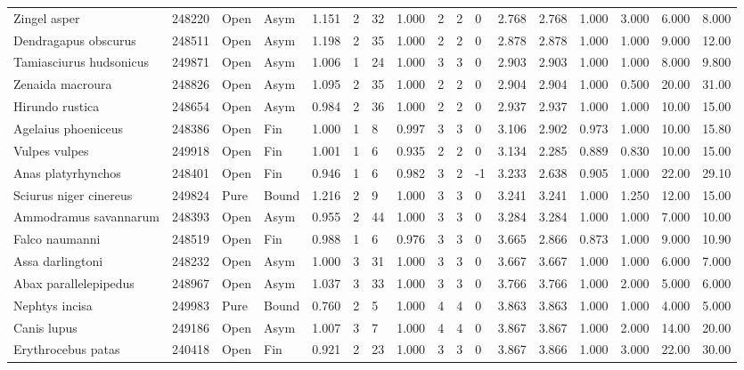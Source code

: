 \documentclass[10pt,a4paper]{amsart}
\theoremstyle{definition}
\theoremstyle{remark}
\numberwithin{equation}{section}
\begin{document}
\begin{table}[ht]
{\begin{tabular}{lllllllllllllllll}
Zingel asper & 248220 & Open & Asym & 1.151 & 2 & 32 & 1.000 & 2 & 2 & 0 & 2.768 & 2.768 & 1.000 & 3.000 & 6.000 & 8.000 \\
Dendragapus obscurus & 248511 & Open & Asym & 1.198 & 2 & 35 & 1.000 & 2 & 2 & 0 & 2.878 & 2.878 & 1.000 & 1.000 & 9.000 & 12.00 \\
Tamiasciurus hudsonicus & 249871 & Open & Asym & 1.006 & 1 & 24 & 1.000 & 3 & 3 & 0 & 2.903 & 2.903 & 1.000 & 1.000 & 8.000 & 9.800 \\
Zenaida macroura & 248826 & Open & Asym & 1.095 & 2 & 35 & 1.000 & 2 & 2 & 0 & 2.904 & 2.904 & 1.000 & 0.500 & 20.00 & 31.00 \\
Hirundo rustica & 248654 & Open & Asym & 0.984 & 2 & 36 & 1.000 & 2 & 2 & 0 & 2.937 & 2.937 & 1.000 & 1.000 & 10.00 & 15.00 \\
Agelaius phoeniceus & 248386 & Open & Fin & 1.000 & 1 & 8 & 0.997 & 3 & 3 & 0 & 3.106 & 2.902 & 0.973 & 1.000 & 10.00 & 15.80 \\
Vulpes vulpes & 249918 & Open & Fin & 1.001 & 1 & 6 & 0.935 & 2 & 2 & 0 & 3.134 & 2.285 & 0.889 & 0.830 & 10.00 & 15.00 \\
Anas platyrhynchos & 248401 & Open & Fin & 0.946 & 1 & 6 & 0.982 & 3 & 2 & -1 & 3.233 & 2.638 & 0.905 & 1.000 & 22.00 & 29.10 \\
Sciurus niger cinereus & 249824 & Pure & Bound & 1.216 & 2 & 9 & 1.000 & 3 & 3 & 0 & 3.241 & 3.241 & 1.000 & 1.250 & 12.00 & 15.00 \\
Ammodramus savannarum & 248393 & Open & Asym & 0.955 & 2 & 44 & 1.000 & 3 & 3 & 0 & 3.284 & 3.284 & 1.000 & 1.000 & 7.000 & 10.00 \\
Falco naumanni & 248519 & Open & Fin & 0.988 & 1 & 6 & 0.976 & 3 & 3 & 0 & 3.665 & 2.866 & 0.873 & 1.000 & 9.000 & 10.90 \\
Assa darlingtoni & 248232 & Open & Asym & 1.000 & 3 & 31 & 1.000 & 3 & 3 & 0 & 3.667 & 3.667 & 1.000 & 1.000 & 6.000 & 7.000 \\
Abax parallelepipedus & 248967 & Open & Asym & 1.037 & 3 & 33 & 1.000 & 3 & 3 & 0 & 3.766 & 3.766 & 1.000 & 2.000 & 5.000 & 6.000 \\
Nephtys incisa & 249983 & Pure & Bound & 0.760 & 2 & 5 & 1.000 & 4 & 4 & 0 & 3.863 & 3.863 & 1.000 & 1.000 & 4.000 & 5.000 \\
Canis lupus & 249186 & Open & Asym & 1.007 & 3 & 7 & 1.000 & 4 & 4 & 0 & 3.867 & 3.867 & 1.000 & 2.000 & 14.00 & 20.00 \\
Erythrocebus patas & 240418 & Open & Fin & 0.921 & 2 & 23 & 1.000 & 3 & 3 & 0 & 3.867 & 3.866 & 1.000 & 3.000 & 22.00 & 30.00 \\

\end{tabular}}
\end{table}
\end{document}
